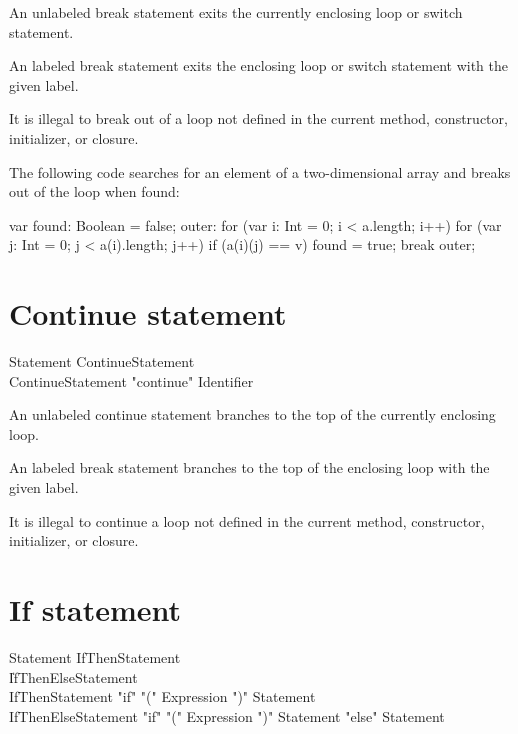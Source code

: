 An unlabeled break statement exits the currently enclosing loop
or switch statement.

An labeled break statement exits the enclosing loop
or switch statement with the given label.

It is illegal to break out of a loop not defined in the current
method, constructor, initializer, or closure.

The following code searches for an element of a two-dimensional
array and breaks out of the loop when found:


\begin{xten}
var found: Boolean = false;
outer: for (var i: Int = 0; i < a.length; i++)
    for (var j: Int = 0; j < a(i).length; j++)
        if (a(i)(j) == v) {
            found = true;
            break outer;
        }
\end{xten}

\section{Continue statement}

\begin{grammar}
Statement \: ContinueStatement \\
ContinueStatement \: \xcd"continue" Identifier\opt \\
\end{grammar}

An unlabeled continue statement branches to the top of the
currently enclosing loop.

An labeled break statement branches to the top of the enclosing loop
with the given label.

It is illegal to continue a loop not defined in the current
method, constructor, initializer, or closure.

\section{If statement}

\begin{grammar}
Statement \: IfThenStatement \\
          \| IfThenElseStatement \\
IfThenStatement \: \xcd"if" \xcd"(" Expression \xcd")" Statement \\
IfThenElseStatement \: \xcd"if" \xcd"(" Expression \xcd")" Statement \xcd"else" Statement \\
\end{grammar}

